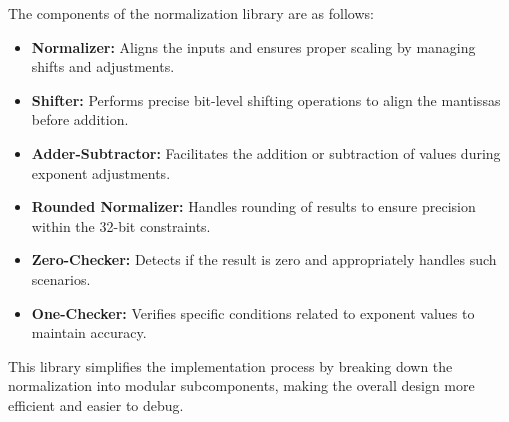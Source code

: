 \documentclass{article}
\begin{document}
The components of the normalization library are as follows:
\begin{itemize}
    \item \textbf{Normalizer:} Aligns the inputs and ensures proper scaling by managing shifts and adjustments.
    \item \textbf{Shifter:} Performs precise bit-level shifting operations to align the mantissas before addition.
    \item \textbf{Adder-Subtractor:} Facilitates the addition or subtraction of values during exponent adjustments.
    \item \textbf{Rounded Normalizer:} Handles rounding of results to ensure precision within the 32-bit constraints.
    \item \textbf{Zero-Checker:} Detects if the result is zero and appropriately handles such scenarios.
    \item \textbf{One-Checker:} Verifies specific conditions related to exponent values to maintain accuracy.
\end{itemize}

This library simplifies the implementation process by breaking down the normalization into modular subcomponents, making the overall design more efficient and easier to debug.
\end{document}
